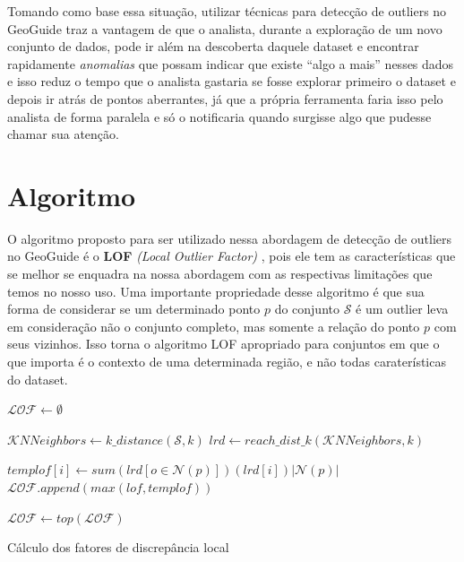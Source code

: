 Tomando como base essa situação, utilizar técnicas para detecção de outliers no GeoGuide traz a vantagem de que o analista, durante a exploração de um novo conjunto de dados, pode ir além na descoberta daquele dataset e encontrar rapidamente \textit{anomalias} que possam indicar que existe ``algo a mais'' nesses dados e isso reduz o tempo que o analista gastaria se fosse explorar primeiro o dataset e depois ir atrás de pontos aberrantes, já que a própria ferramenta faria isso pelo analista de forma paralela e só o notificaria quando surgisse algo que pudesse chamar sua atenção.

\section{Algoritmo}

O algoritmo proposto para ser utilizado nessa abordagem de detecção de outliers no GeoGuide \cite{omidvarTehrani2017} é o \textbf{LOF} \textit{(Local Outlier Factor)} \cite{Breunig:2000:LID:335191.335388}, pois ele tem as características que se melhor se enquadra na nossa abordagem com as respectivas limitações que temos no nosso uso. Uma importante propriedade desse algoritmo é que sua forma de considerar se um determinado ponto $p$ do conjunto $\mathcal{S}$ é um outlier leva em consideração não o conjunto completo, mas somente a relação do ponto $p$ com seus vizinhos. Isso torna o algoritmo LOF apropriado para conjuntos em que o que importa é o contexto de uma determinada região, e não todas caraterísticas do dataset.

\begin{algorithm}[!h]
	\DontPrintSemicolon
	$\mathcal{LOF} \gets \emptyset$\;
	{
		$\mathcal{K}NNeighbors \gets \mathit{k\_distance}(\mathcal{S}, k)$\label{ln:k_distance}\;
		$lrd \gets \mathit{reach\_dist\_k}(\mathcal{K}NNeighbors, k)$\label{ln:reach_dist_k}\;

		{
			$templof[i] \gets sum(lrd[o \in \mathcal{N} (p)])(lrd[i])|\mathcal{N}(p)|$\;
			$\mathcal{LOF}.append(max(lof, templof))$\;
		}
	}
	$\mathcal{LOF} \gets top(\mathcal{LOF})$\;
	\;  
	\caption{Cálculo dos fatores de discrepância local}
	\label{algo:lof}
\end{algorithm}

